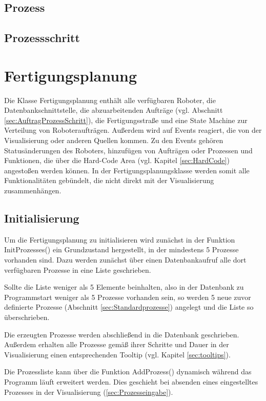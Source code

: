\subsection{Prozess}
\label{sec:Prozess}
\subsection{Prozessschritt}
\label{sec:Prozessschritt}


\section{Fertigungsplanung}

Die Klasse Fertigungsplanung enthält alle verfügbaren Roboter, die Datenbankschnittstelle, die abzuarbeitenden Aufträge (vgl. Abschnitt \ref{sec:AuftragProzessSchritt}), die Fertigungsstraße und eine State Machine zur Verteilung von Roboteraufträgen. Außerdem wird auf Events reagiert, die von der Visualisierung oder anderen Quellen kommen. Zu den Events gehören Statusänderungen des Roboters, hinzufügen von Aufträgen oder Prozessen und Funktionen, die über die Hard-Code Area (vgl. Kapitel \ref{sec:HardCode}) angestoßen werden können. 
In der Fertigungsplanungsklasse werden somit alle Funktionalitäten gebündelt, die nicht direkt mit der Visualisierung zusammenhängen. 

\subsection{Initialisierung}
\label{sec:Fertigunginit}

Um die Fertigungsplanung zu initialisieren wird zunächst in der Funktion InitProzesses() ein Grundzustand hergestellt, in der mindestens 5 Prozesse vorhanden sind. Dazu werden zunächst über einen Datenbankaufruf alle dort verfügbaren Prozesse in eine Liste geschrieben. 

Sollte die Liste weniger als 5 Elemente beinhalten, also in der Datenbank zu Programmstart weniger als 5 Prozesse vorhanden sein, so werden 5 neue zuvor definierte Prozesse (Abschnitt \ref{sec:Standardprozesse}) angelegt und die Liste so überschrieben. 

Die erzeugten Prozesse werden abschließend in die Datenbank geschrieben. Außerdem erhalten alle Prozesse gemäß ihrer Schritte und Dauer in der Visualisierung einen entsprechenden Tooltip (vgl. Kapitel \ref{sec:tooltips}). 

Die Prozessliste kann über die Funktion AddProzess() dynamisch während das Programm läuft erweitert werden. Dies geschieht bei absenden eines eingestelltes Prozesses in der Visualisierung (\ref{sec:Prozesseingabe}). 

